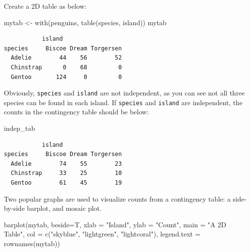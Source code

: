 \documentclass[
  letterpaper,
]{book}
\newenvironment{Shaded}{\begin{snugshade}}{\end{snugshade}}
\newcommand{\AttributeTok}[1]{\textcolor[rgb]{0.40,0.45,0.13}{#1}}
\newcommand{\FunctionTok}[1]{\textcolor[rgb]{0.28,0.35,0.67}{#1}}
\newcommand{\NormalTok}[1]{\textcolor[rgb]{0.00,0.23,0.31}{#1}}
\newcommand{\OtherTok}[1]{\textcolor[rgb]{0.00,0.23,0.31}{#1}}
\newcommand{\StringTok}[1]{\textcolor[rgb]{0.13,0.47,0.30}{#1}}
\begin{document}
Create a 2D table as below:

\begin{Shaded}
\begin{Highlighting}[]
\NormalTok{mytab }\OtherTok{\textless{}{-}} \FunctionTok{with}\NormalTok{(penguins, }\FunctionTok{table}\NormalTok{(species, island))}
\NormalTok{mytab}
\end{Highlighting}
\end{Shaded}

\begin{verbatim}
           island
species     Biscoe Dream Torgersen
  Adelie        44    56        52
  Chinstrap      0    68         0
  Gentoo       124     0         0
\end{verbatim}

Obviously, \texttt{species} and \texttt{island} are not independent, as
you can see not all three species can be found in each island. If
\texttt{species} and \texttt{island} are independent, the counts in the
contingency table should be below:

\begin{Shaded}
\begin{Highlighting}[]
\NormalTok{indep\_tab}
\end{Highlighting}
\end{Shaded}

\begin{verbatim}
           island
species     Biscoe Dream Torgersen
  Adelie        74    55        23
  Chinstrap     33    25        10
  Gentoo        61    45        19
\end{verbatim}

Two popular graphs are used to visualize counts from a contingency
table: a side-by-side barplot, and mosaic plot.

\begin{Shaded}
\begin{Highlighting}[]
\FunctionTok{barplot}\NormalTok{(mytab,}
        \AttributeTok{beside=}\NormalTok{T,}
        \AttributeTok{xlab =} \StringTok{"Island"}\NormalTok{,}
        \AttributeTok{ylab =} \StringTok{"Count"}\NormalTok{,}
        \AttributeTok{main =} \StringTok{"A 2D Table"}\NormalTok{,}
        \AttributeTok{col =} \FunctionTok{c}\NormalTok{(}\StringTok{"skyblue"}\NormalTok{, }\StringTok{"lightgreen"}\NormalTok{, }\StringTok{"lightcoral"}\NormalTok{),}
        \AttributeTok{legend.text =} \FunctionTok{rownames}\NormalTok{(mytab))}
\end{Highlighting}
\end{Shaded}
\end{document}
